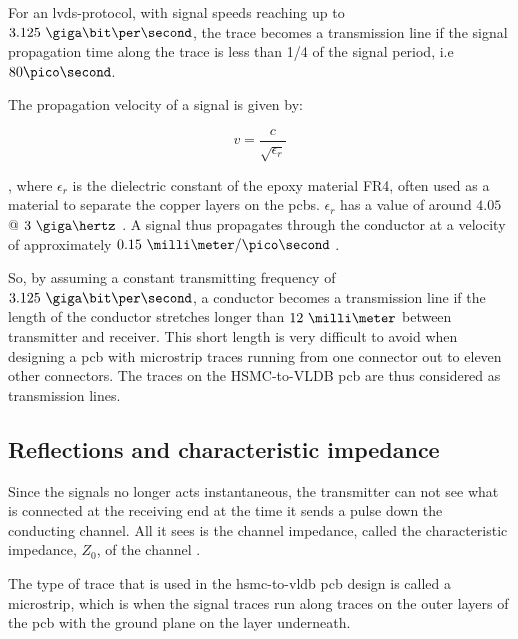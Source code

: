 \documentclass[main.tex]{subfiles}
\begin{document}
For an \gls{lvds}-protocol, with signal speeds reaching up to $3.125\ \giga\bit\per\second$, the trace becomes a transmission line if the signal propagation time along the trace is less than 1/4 of the signal period, i.e $80\pico\second$. 

The propagation velocity of a signal is given by:

\begin{equation}
    v = \frac{c}{\sqrt{\epsilon_r}}
\end{equation}

, where $\epsilon_r$ is the dielectric constant of the epoxy material FR4, often used as a material to separate the copper layers on the \glspl{pcb}. $\epsilon_r$ has a value of around $4.05$ @ $3\ \giga\hertz$ \cite{polar15}.
A signal thus propagates through the conductor at a velocity of approximately $0.15\ \milli\meter/\pico\second$ \cite[example 13.7]{weste11}.

So, by assuming a constant transmitting frequency of $3.125\ \giga\bit\per\second$, a conductor becomes a transmission line if the length of the conductor stretches longer than $12\ \milli\meter$ between transmitter and receiver. This short length is very difficult to avoid when designing a \gls{pcb} with microstrip traces running from one connector out to eleven other connectors. The traces on the HSMC-to-VLDB \gls{pcb} are thus considered as transmission lines. 


\subsection{Reflections and characteristic impedance}

Since the signals no longer acts instantaneous, the transmitter can not see what is connected at the receiving end at the time it sends a pulse down the conducting channel. All it sees is the channel impedance, called the characteristic impedance, $Z_0$, of the channel \cite{weste11}.

The type of trace that is used in the \gls{hsmc}-to-\gls{vldb} \gls{pcb} design is called a microstrip, which is when the signal traces run along traces on the outer layers of the \gls{pcb} with the ground plane on the layer underneath. 

\end{document}
